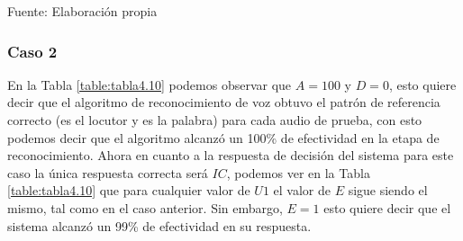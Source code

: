 \begin{center}
\begin{table}[H]
\centering
\caption{\small{Resultados para obtener U1 en el caso 1.}}
\label{table:tabla4.9}
\vskip 0.2cm
\begin{center}
\vskip 0.2cm
{\small{Fuente: Elaboración propia}}
\end{center}
\end{table}
\end{center}

\subsubsection{Caso 2}
En la Tabla \ref{table:tabla4.10} podemos observar que $A = 100$ y $D = 0$, esto quiere decir que el algoritmo de reconocimiento de voz obtuvo el patrón de referencia correcto (es el locutor y es la palabra) para cada audio de prueba, con esto podemos decir que el algoritmo alcanzó un 100\% de efectividad en la etapa de reconocimiento.
\vskip 0.5cm
Ahora en cuanto a la respuesta de decisión del sistema para este caso la única respuesta correcta será $IC$, podemos ver en la Tabla \ref{table:tabla4.10} que para cualquier valor de $U1$ el valor de $E$ sigue siendo el mismo, tal como en el caso anterior. Sin embargo, $E = 1$ esto quiere decir que el sistema alcanzó un 99\% de efectividad en su respuesta.

